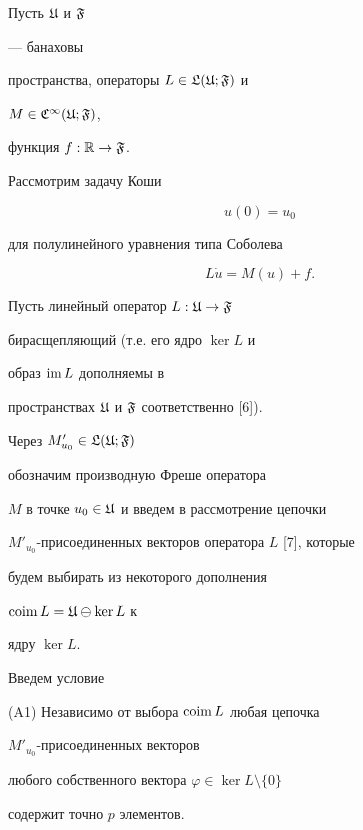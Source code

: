 Пусть $\frak U$ и $\frak F$


--- банаховы


пространства, операторы $L\in\frak L(\frak U;\frak F)$ и


$M\in \frak C^\infty(\frak U;\frak F)$,


функция $f:\Bbb R\to\frak F$.


Рассмотрим задачу Коши


\begin{equation}


u(0)=u_0


\end{equation}


для полулинейного уравнения типа Соболева


\begin{equation}


L\Dot u=M(u)+f.


\end{equation}


Пусть линейный оператор $L:\frak U\to\frak F$


бирасщепляющий (т.е. его ядро $\ker L$ и


образ $\operatorname{im} L$ дополняемы в


пространствах $\frak U$ и $\frak F$ соответственно [6]).


Через $M'_{u_0}\in\frak L(\frak U;\frak F)$


обозначим производную Фреше оператора


$M$ в точке $u_0\in\frak U$ и введем в рассмотрение цепочки


$M'_{u_0}$-присоединенных векторов оператора $L$ [7], которые


будем выбирать из некоторого дополнения


$\operatorname{coim} L=\frak U\ominus\ker L$ к


ядру $\ker L$.





Введем условие





(A1) Независимо от выбора $\operatorname{coim} L$ любая цепочка


$M'_{u_0}$-присоединенных векторов


любого собственного вектора $\varphi\in\ker L\setminus\{0\}$


содержит точно $p$ элементов.





